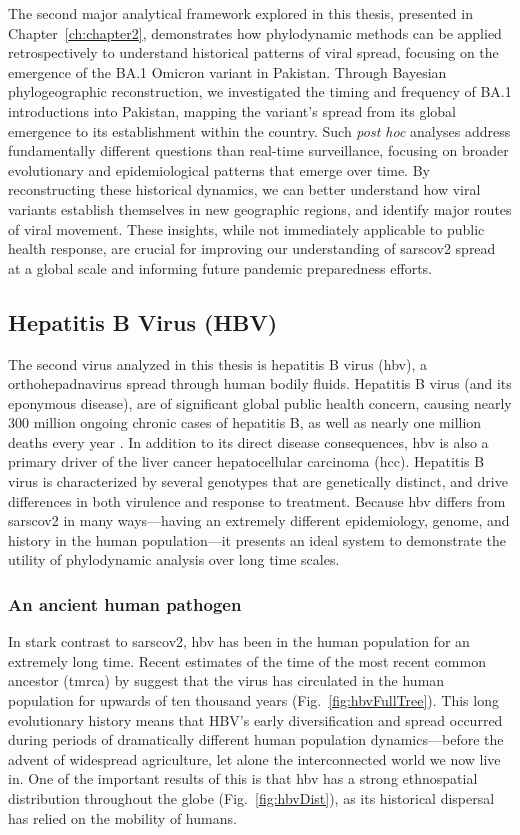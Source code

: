 The second major analytical framework explored in this thesis, presented in Chapter~\ref{ch:chapter2}, demonstrates how phylodynamic methods can be applied retrospectively to understand historical patterns of viral spread, focusing on the emergence of the BA.1 Omicron variant in Pakistan.
Through Bayesian phylogeographic reconstruction, we investigated the timing and frequency of BA.1 introductions into Pakistan, mapping the variant's spread from its global emergence to its establishment within the country.
Such \textit{post hoc} analyses address fundamentally different questions than real-time surveillance, focusing on broader evolutionary and epidemiological patterns that emerge over time.
By reconstructing these historical dynamics, we can better understand how viral variants establish themselves in new geographic regions, and identify major routes of viral movement.
These insights, while not immediately applicable to public health response, are crucial for improving our understanding of \gls{sarscov2} spread at a global scale and informing future pandemic preparedness efforts.

\subsection{Hepatitis B Virus (HBV)}
The second virus analyzed in this thesis is hepatitis B virus (\gls{hbv}), a orthohepadnavirus spread through human bodily fluids.
Hepatitis B virus (and its eponymous disease), are of significant global public health concern, causing nearly 300 million ongoing chronic cases of hepatitis B, as well as nearly one million deaths every year \citep{revill2020evolution}.
In addition to its direct disease consequences, \gls{hbv} is also a primary driver of the liver cancer hepatocellular carcinoma (\gls{hcc}).
Hepatitis B virus is characterized by several genotypes that are genetically distinct, and drive differences in both virulence and response to treatment.
Because \gls{hbv} differs from \gls{sarscov2} in many ways---having an extremely different epidemiology, genome, and history in the human population---it presents an ideal system to demonstrate the utility of phylodynamic analysis over long time scales.

\subsubsection{An ancient human pathogen}
In stark contrast to \gls{sarscov2}, \gls{hbv} has been in the human population for an extremely long time.
Recent estimates of the time of the most recent common ancestor (\gls{tmrca}) by \citet{kocher2021ten} suggest that the virus has circulated in the human population for upwards of ten thousand years (Fig.~\ref{fig:hbvFullTree}).
This long evolutionary history means that HBV's early diversification and spread occurred during periods of dramatically different human population dynamics---before the advent of widespread agriculture, let alone the interconnected world we now live in. 
One of the important results of this is that \gls{hbv} has a strong ethnospatial distribution throughout the globe (Fig.~\ref{fig:hbvDist}), as its historical dispersal has relied on the mobility of humans.

